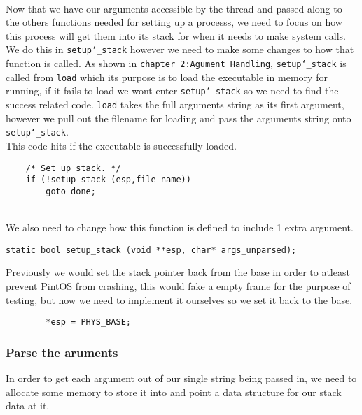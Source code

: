 \documentclass[]{article}
\begin{document}
    \paragraph{}
    Now that we have our arguments accessible by the thread and passed along to the others functions needed for setting up a processs, we need to focus on how this process will get them into its stack for when it needs to make system calls. We do this in \texttt{setup\char`_stack} however we need to make some changes to how that function is called. As shown in \texttt{chapter 2:Agument Handling}, \texttt{setup\char`_stack} is called from \texttt{load} which its purpose is to load the executable in memory for running, if it fails to load we wont enter \texttt{setup\char`_stack} so we need to find the success related code. \texttt{load} takes the full arguments string as its first argument, however we pull out the filename for loading and pass the arguments string onto \texttt{setup\char`_stack}. \newline\\
    This code hits if the executable is successfully loaded.
    \lstset{language=C, tabsize=2}    
    \begin{lstlisting}
	/* Set up stack. */
	if (!setup_stack (esp,file_name))
		goto done;
    \end{lstlisting}
  \texttt{}\\  
    We also need to change how this function is defined to include 1 extra argument.\\
    \lstset{language=C, tabsize=2}    
    \begin{lstlisting}
static bool setup_stack (void **esp, char* args_unparsed);    
    \end{lstlisting}
    Previously we would set the stack pointer back from the base in order to atleast prevent PintOS from crashing, this would fake a empty frame for the purpose of testing, but now we need to implement it ourselves so we set it back to the base.
    \lstset{language=C, tabsize=2}    
    \begin{lstlisting}
		*esp = PHYS_BASE;
    \end{lstlisting}
   \newpage
   \subsubsection{Parse the aruments}
   In order to get each argument out of our single string being passed in, we need to allocate some memory to store it into and point a data structure for our stack data at it.\\
   
\end{document}
